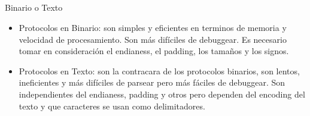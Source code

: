 \subsection*{}
\begin{frame}[fragile]{Binario o Texto}
    \begin{itemize}
        \item Protocolos en Binario: son simples y eficientes en terminos de memoria y velocidad de procesamiento. Son m\'as dif\'iciles de debuggear. Es necesario tomar en consideraci\'on el endianess, el padding, los tama\~nos y los signos.
        \item Protocolos en Texto: son la contracara de los protocolos binarios, son lentos, ineficientes y m\'as dif\'iciles de parsear pero m\'as f\'aciles de debuggear. Son independientes del endianess, padding y otros pero dependen del encoding del texto y que caracteres se usan como delimitadores.
    \end{itemize}
\end{frame}


